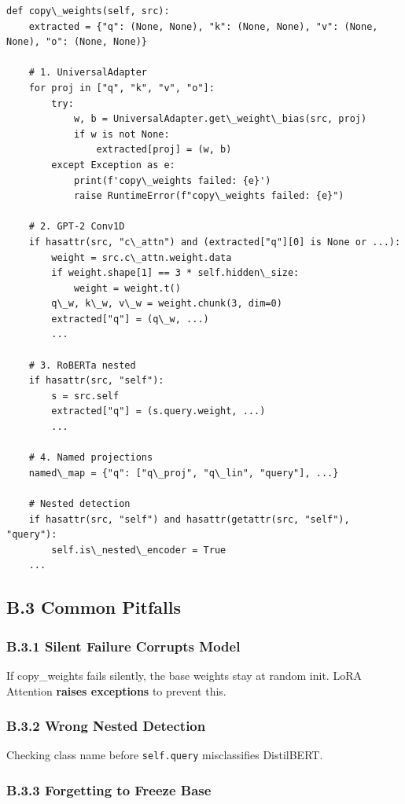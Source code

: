\begin{lstlisting}
def copy\_weights(self, src):
    extracted = {"q": (None, None), "k": (None, None), "v": (None, None), "o": (None, None)}
    
    # 1. UniversalAdapter
    for proj in ["q", "k", "v", "o"]:
        try:
            w, b = UniversalAdapter.get\_weight\_bias(src, proj)
            if w is not None:
                extracted[proj] = (w, b)
        except Exception as e:
            print(f'copy\_weights failed: {e}')
            raise RuntimeError(f"copy\_weights failed: {e}")
    
    # 2. GPT-2 Conv1D
    if hasattr(src, "c\_attn") and (extracted["q"][0] is None or ...):
        weight = src.c\_attn.weight.data
        if weight.shape[1] == 3 * self.hidden\_size:
            weight = weight.t()
        q\_w, k\_w, v\_w = weight.chunk(3, dim=0)
        extracted["q"] = (q\_w, ...)
        ...
    
    # 3. RoBERTa nested
    if hasattr(src, "self"):
        s = src.self
        extracted["q"] = (s.query.weight, ...)
        ...
    
    # 4. Named projections
    named\_map = {"q": ["q\_proj", "q\_lin", "query"], ...}
    
    # Nested detection
    if hasattr(src, "self") and hasattr(getattr(src, "self"), "query"):
        self.is\_nested\_encoder = True
    ...
\end{lstlisting}

\subsection{B.3 Common Pitfalls}

\subsubsection{B.3.1 Silent Failure Corrupts Model}

If copy\_weights fails silently, the base weights stay at random init. 
LoRA Attention \textbf{raises exceptions} to prevent this.

\subsubsection{B.3.2 Wrong Nested Detection}

Checking class name before \texttt{self.query} misclassifies DistilBERT.

\subsubsection{B.3.3 Forgetting to Freeze Base}

